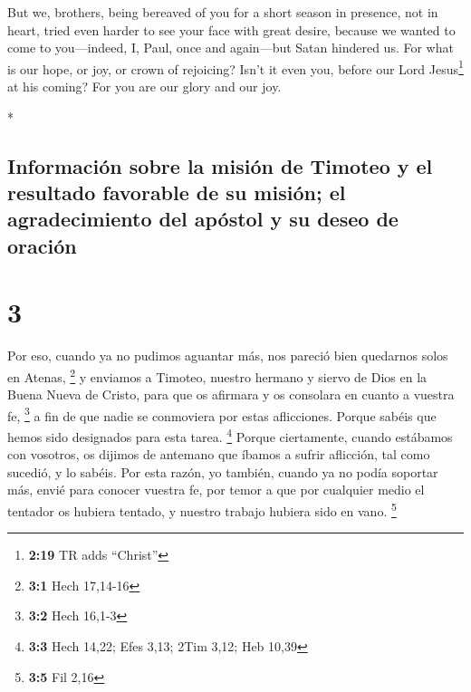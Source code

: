 \begin{paracol}{2}
\begin{otherlanguage}{english}
 But we, brothers, being bereaved of you for a short
season in presence, not in heart, tried even harder to see your face
with great desire,  because we wanted to come to
you---indeed, I, Paul, once and again---but Satan hindered us.
 For what is our hope, or joy, or crown of rejoicing?
Isn't it even you, before our Lord Jesus\footnote{\textbf{2:19} TR adds
  ``Christ''} at his coming?  For you are our glory and
our joy.

\end{otherlanguage}

\switchcolumn[0]*

\hypertarget{informaciuxf3n-sobre-la-misiuxf3n-de-timoteo-y-el-resultado-favorable-de-su-misiuxf3n-el-agradecimiento-del-apuxf3stol-y-su-deseo-de-oraciuxf3n}{%
\subsection{Información sobre la misión de Timoteo y el resultado
favorable de su misión; el agradecimiento del apóstol y su deseo de
oración}\label{informaciuxf3n-sobre-la-misiuxf3n-de-timoteo-y-el-resultado-favorable-de-su-misiuxf3n-el-agradecimiento-del-apuxf3stol-y-su-deseo-de-oraciuxf3n}}

\hypertarget{section-4}{%
\section{3}\label{section-4}}

 Por eso, cuando ya no pudimos aguantar más, nos pareció
bien quedarnos solos en Atenas, \footnote{\textbf{3:1} Hech 17,14-16}
 y enviamos a Timoteo, nuestro hermano y siervo de Dios en
la Buena Nueva de Cristo, para que os afirmara y os consolara en cuanto
a vuestra fe, \footnote{\textbf{3:2} Hech 16,1-3}  a fin
de que nadie se conmoviera por estas aflicciones. Porque sabéis que
hemos sido designados para esta tarea. \footnote{\textbf{3:3} Hech
  14,22; Efes 3,13; 2Tim 3,12; Heb 10,39}  Porque
ciertamente, cuando estábamos con vosotros, os dijimos de antemano que
íbamos a sufrir aflicción, tal como sucedió, y lo sabéis. 
Por esta razón, yo también, cuando ya no podía soportar más, envié para
conocer vuestra fe, por temor a que por cualquier medio el tentador os
hubiera tentado, y nuestro trabajo hubiera sido en vano. \footnote{\textbf{3:5}
  Fil 2,16}


\end{paracol}

